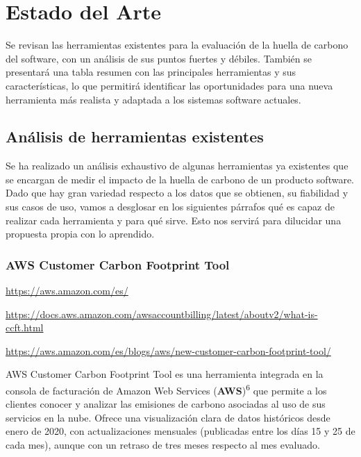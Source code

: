 \documentclass[12pt,a4paper]{report}
\begin{document}
\chapter{Estado del Arte}

Se revisan las herramientas existentes para la evaluación de la huella de carbono del software, con un análisis de sus puntos fuertes y débiles. También se presentará una tabla resumen con las principales herramientas y sus características, lo que permitirá identificar las oportunidades para una nueva herramienta más realista y adaptada a los sistemas software actuales.

\section{Análisis de herramientas existentes}

Se ha realizado un análisis exhaustivo de algunas herramientas ya existentes que se encargan de medir el impacto de la huella de carbono de un producto software. Dado que hay gran variedad respecto a los datos que se obtienen, su fiabilidad y sus casos de uso, vamos a desglosar en los siguientes párrafos qué es capaz de realizar cada herramienta y para qué sirve. Esto nos servirá para dilucidar una propuesta propia con lo aprendido.

\subsection*{AWS Customer Carbon Footprint Tool}

\href{https://aws.amazon.com/es/}{https://aws.amazon.com/es/}

\href{https://docs.aws.amazon.com/awsaccountbilling/latest/aboutv2/what-is-ccft.html}{https://docs.aws.amazon.com/awsaccountbilling/latest/aboutv2/what-is-ccft.html}

\href{https://aws.amazon.com/es/blogs/aws/new-customer-carbon-footprint-tool/}{https://aws.amazon.com/es/blogs/aws/new-customer-carbon-footprint-tool/}

AWS Customer Carbon Footprint Tool es una herramienta integrada en la consola de facturación de Amazon Web Services (\textbf{AWS})\textsuperscript{6} que permite a los clientes conocer y analizar las emisiones de carbono asociadas al uso de sus servicios en la nube. Ofrece una visualización clara de datos históricos desde enero de 2020, con actualizaciones mensuales (publicadas entre los días 15 y 25 de cada mes), aunque con un retraso de tres meses respecto al mes evaluado.
\end{document}
